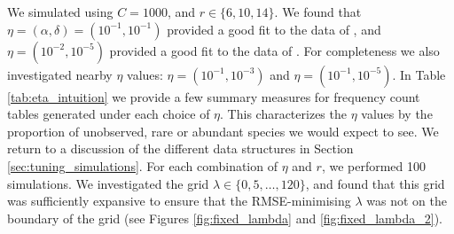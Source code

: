 \documentclass[oupdraft]{bio}
\begin{document}
We simulated using $C = 1000$, and $r \in \{6, 10, 14\}$.  We found that $\eta = (\alpha, \delta) = (10^{-1}, 10^{-1})$  provided a good fit to the data of  \citet{walsh2014restricted}, and $\eta = (10^{-2}, 10^{-5})$ provided a good fit to the data of \citet{tromas_2017}.
For completeness we also investigated nearby $\eta$ values: $\eta = \left( 10^{-1}, 10^{-3} \right)$ and $\eta = \left( 10^{-1}, 10^{-5}\right)$.
In Table \ref{tab:eta_intuition} we provide a few summary measures for frequency count tables generated under each choice of $\eta$.  This characterizes the $\eta$ values by the proportion of unobserved, rare or abundant species we would expect to see. We return to a discussion of the different data structures in Section \ref{sec:tuning_simulations}.
For each combination of $\eta$ and $r$, we performed 100 simulations.
We investigated the grid $\lambda \in \{0, 5, \dots , 120\}$, and found that this grid was sufficiently expansive to ensure that the RMSE-minimising $\lambda$ was not on the boundary of the grid
(see Figures \ref{fig:fixed_lambda} and \ref{fig:fixed_lambda_2}).


\end{document}
